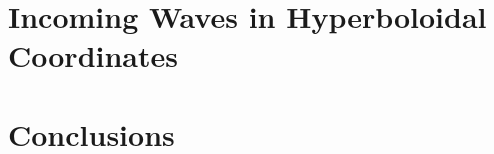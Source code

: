 \documentclass[
11pt, %
english, %
singlespacing, %
headsepline, %
]{MastersDoctoralThesis} %
\begin{document}

\section{Incoming Waves in Hyperboloidal Coordinates}




\section{Conclusions}



\printbibliography[heading=secbib]

\end{document}
